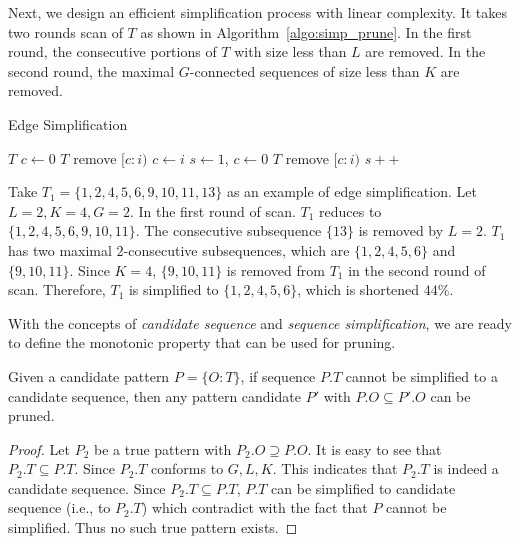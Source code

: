 Next, we design an efficient simplification process with linear complexity.
It takes two rounds scan of $T$ as shown in Algorithm~\ref{algo:simp_prune}. 
In the first round, the consecutive portions of $T$ with size less than $L$ are removed.
In the second round, the maximal $G$-connected sequences of size less than $K$ are removed. 

\begin{algorithm}
\caption{Edge Simplification}
\label{algo:simp_prune}
\begin{algorithmic}[1]
\Require $T$
\State $c \gets 0$
			\State $T$ remove $[c:i)$
		\EndIf
		\State $c \gets i$
	\EndIf
\EndFor
{}
\State $s\gets 1$, $c\gets 0$
			\State $T$ remove $[c:i)$
		\EndIf
	\Else
		\State $s++$
	\EndIf
\EndFor
\end{algorithmic}
\end{algorithm}

\begin{example}
Take $T_1=\{1,2,4,5,6,9,10,11,13\}$ as an example of edge simplification. Let $L = 2, K = 4, G = 2$.
In the first round of scan. $T_1$ reduces to $\{1,2,4,5,6,9,10,11\}$. The consecutive subsequence $\{13\}$
is removed by $L=2$. $T_1$ has two maximal $2$-consecutive subsequences, which 
are $\{1,2,4,5,6\}$ and $\{9,10,11\}$. Since $K=4$, $\{9,10,11\}$ is removed
from $T_1$ in the second round of scan. Therefore, $T_1$ is simplified to $\{1,2,4,5,6\}$, which is shortened $44\%$.
\end{example}


With the concepts of \textit{candidate sequence} and \textit{sequence simplification}, we are ready to define the monotonic property that can be used for pruning.
\begin{theorem}\label{THM:SPM_TM}
Given a candidate pattern $P=\{O:T\}$, if sequence $P.T$ cannot be simplified to a candidate sequence, then any pattern candidate $P'$ with $P.O \subseteq P'.O$ can be pruned.
\end{theorem}

\begin{proof}
Let $P_2$ be a true pattern with $P_2.O \supseteq P.O$. It is easy to see that $P_2.T \subseteq P.T$. Since $P_2.T$ conforms to $G,L,K$. This indicates that $P_2.T$ is indeed a candidate sequence. Since $P_2.T \subseteq P.T$, $P.T$ can be simplified to candidate sequence (i.e., to $P_2.T$) which contradict with the fact that $P$ cannot be simplified. Thus no such true pattern exists.
\end{proof}

